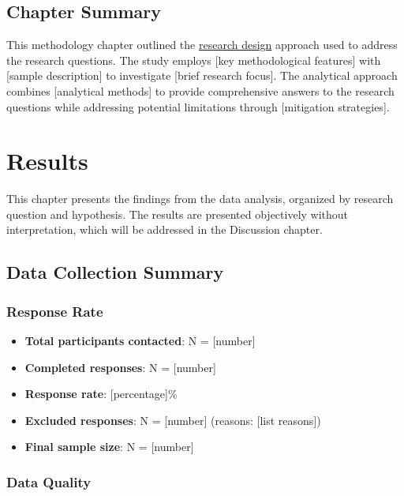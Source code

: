 \documentclass[
  12pt,
  letterpaper,
  12pt,
  letterpaper,
  oneside]{report}
\providecommand{\tightlist}{%
  \setlength{\itemsep}{0pt}\setlength{\parskip}{0pt}}
\begin{document}
\section{Chapter Summary}\label{chapter-summary-1}

This methodology chapter outlined the
\hyperref[research-design]{research design} approach used to address the
research questions. The study employs {[}key methodological features{]}
with {[}sample description{]} to investigate {[}brief research focus{]}.
The analytical approach combines {[}analytical methods{]} to provide
comprehensive answers to the research questions while addressing
potential limitations through {[}mitigation strategies{]}.


\chapter{Results}\label{results}

This chapter presents the findings from the data analysis, organized by
research question and hypothesis. The results are presented objectively
without interpretation, which will be addressed in the Discussion
chapter.

\section{Data Collection Summary}\label{data-collection-summary}

\subsection{Response Rate}\label{response-rate}

\begin{itemize}
\tightlist
\item
  \textbf{Total participants contacted}: N = {[}number{]}
\item
  \textbf{Completed responses}: N = {[}number{]}
\item
  \textbf{Response rate}: {[}percentage{]}\%
\item
  \textbf{Excluded responses}: N = {[}number{]} (reasons: {[}list
  reasons{]})
\item
  \textbf{Final sample size}: N = {[}number{]}
\end{itemize}

\subsection{Data Quality}\label{data-quality}
\end{document}
